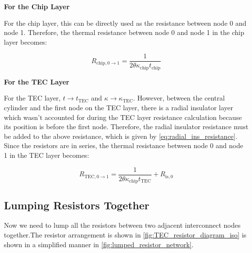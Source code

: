 \documentclass[10pt,a4paper,twocolumn]{article}
\begin{document}
\textbf{For the Chip Layer}

For the chip layer, this can be directly used as the resistance between node 0 and node 1. Therefore, the thermal resistance between node 0 and node 1 in the chip layer becomes:

\begin{equation}
	R_{\text{chip},0 \to 1} =  \frac{1}{2\theta \kappa_{\text{chip}} t_{\text{chip}}}
	\label{eq:R_chip_0_to_1}
\end{equation}

\textbf{For the TEC Layer}

For the TEC layer, $t\to t_{\text{TEC}}$ and $\kappa \to \kappa_{\text{TEC}}$. However, between the central cylinder and the first node on the TEC layer, there is a radial insulator layer which wasn't accounted for during the TEC layer resistance calculation because its position is before the first node. Therefore, the radial insulator resistance must be added to the above resistance, which is given by \cref{eq:radial_ins_resistance}. Since the resistors are in series, the thermal resistance between node 0 and node 1 in the TEC layer becomes:

\begin{equation}
	R_{\text{TEC},0 \to 1} = \frac{1}{2\theta \kappa_{\text{chip}} t_{\text{TEC}}} + R_{\text{is},0}
	\label{eq:R_TEC_0_to_1}
\end{equation}

\subsection{Lumping Resistors Together}

Now we need to lump all the resistors between two adjacent interconnect nodes together.The resistor arrangement is shown in \cref{fig:TEC_resistor_diagram_iso} is shown in a simplified manner in \cref{fig:lumped_resistor_network}.
\end{document}
